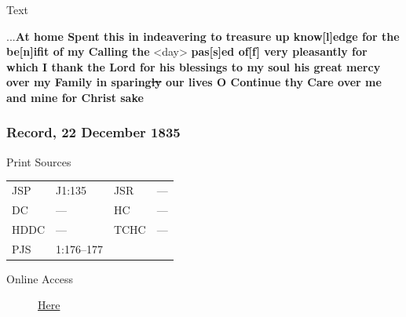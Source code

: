 			
			\begin{description}
				\item[Text]
			\end{description}
			
				...\textbf{At home Spent this in indeavering to treasure up know[l]edge for the be[n]ifit of my Calling the} <day> \textbf{pas[s]ed of[f] very pleasantly for which I thank the Lord for his blessings to my soul his great mercy over my Family in sparing\sout{ly} our lives O Continue thy Care over me and mine for Christ sake}
				
		\subsubsection{Record, 22 December 1835}
			\label{EMS-1835-JS-22-DEC-1835}
			
			\begin{description}
				\item[Print Sources]
			\end{description}

				\begin{tabular}{p{0.5in}p{1in}p{0.5in}p{1in}}
				JSP	 	& J1:135		& JSR 		& --- \\
				DC	 	& --- 				& HC 		& --- \\
				HDDC 	& ---				& TCHC 		& --- \\
				PJS 	& 1:176--177				& 	 		&  \\
				\end{tabular}
			
			\begin{description}
				\item[Online Access] \href{https://www.josephsmithpapers.org/paper-summary/journal-1835-1836/89}{Here}
			\end{description}
			
